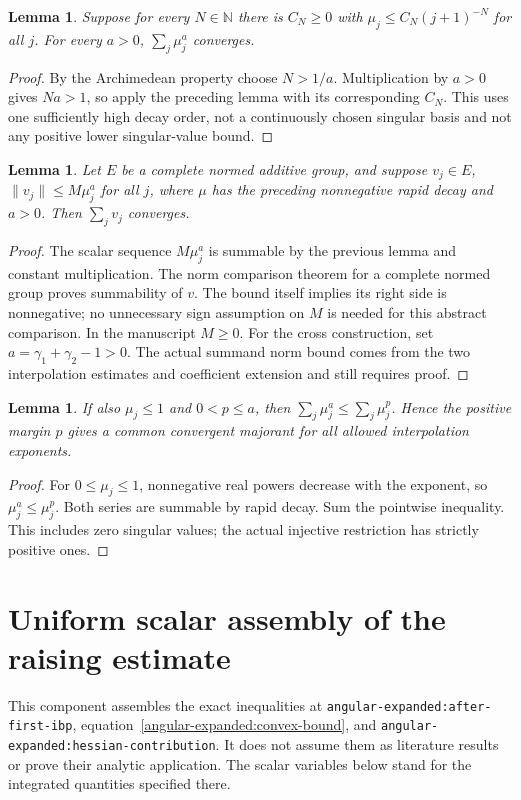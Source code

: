 \documentclass[11pt]{article}
\newtheorem{lemma}[theorem]{Lemma}
\theoremstyle{definition}
\theoremstyle{remark}
\numberwithin{equation}{section}
\begin{document}
\begin{lemma}\label{cross-formal:rapid-decay}
Suppose for every $N\in\mathbb N$ there is $C_N\ge0$ with
$\mu_j\le C_N(j+1)^{-N}$ for all $j$. For every $a>0$,
$\sum_j\mu_j^a$ converges.
\end{lemma}
\begin{proof}
By the Archimedean property choose $N>1/a$. Multiplication by $a>0$
gives $Na>1$, so apply the preceding lemma with its corresponding
$C_N$. This uses one sufficiently high decay order, not a continuously
chosen singular basis and not any positive lower singular-value bound.
\end{proof}

\begin{lemma}\label{cross-formal:banach-series}
Let $E$ be a complete normed additive group, and suppose $v_j\in E$,
$\|v_j\|\le M\mu_j^a$ for all $j$, where $\mu$ has the preceding
nonnegative rapid decay and $a>0$. Then $\sum_jv_j$ converges.
\end{lemma}
\begin{proof}
The scalar sequence $M\mu_j^a$ is summable by the previous lemma and
constant multiplication. The norm comparison theorem for a complete
normed group proves summability of $v$. The bound itself implies its
right side is nonnegative; no unnecessary sign assumption on $M$ is
needed for this abstract comparison. In the manuscript $M\ge0$.
For the cross construction, set $a=\gamma_1+\gamma_2-1>0$.
The actual summand norm bound comes from the two interpolation
estimates and coefficient extension and still requires proof.
\end{proof}
\begin{lemma}\label{cross-formal:uniform-margin}
If also $\mu_j\le1$ and $0<p\le a$, then
$\sum_j\mu_j^a\le\sum_j\mu_j^p$. Hence the positive margin $p$
gives a common convergent majorant for all allowed interpolation exponents.
\end{lemma}
\begin{proof}
For $0\le\mu_j\le1$, nonnegative real powers decrease with the exponent,
so $\mu_j^a\le\mu_j^p$. Both series are summable by rapid decay.
Sum the pointwise inequality. This includes zero singular values;
the actual injective restriction has strictly positive ones.
\end{proof}

\clearpage

\section{Uniform scalar assembly of the raising estimate}
\label{raising-form:assembly}
This component assembles the exact inequalities at
\texttt{angular-expanded:after-first-ibp},
equation~\eqref{angular-expanded:convex-bound}, and
\texttt{angular-expanded:hessian-contribution}. It does not assume them
as literature results or prove their analytic application. The scalar
variables below stand for the integrated quantities specified there.
\end{document}
